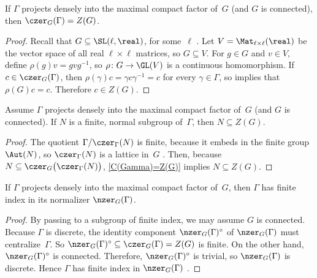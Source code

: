 \begin{cor} \label{C(Gamma)=Z(G)}
 If\/ $\Gamma$ projects densely into the maximal compact factor of~$G$ \textup(and $G$ is connected\/\textup), then $\czer_G(\Gamma) = Z(G)$.
 \end{cor}

\begin{proof}
Recall that $G \subseteq \SL(\ell,\real)$, for some~$\ell$ .
 Let $V = \Mat_{\ell \times \ell}(\real)$ be the vector
space of all real $\ell \times \ell$ matrices, so $G
\subseteq V$. For $g \in G$ and $v \in V$, define $\rho(g) v
= g v g^{-1}$, so $\rho \colon G \to \GL(V)$ is a
continuous homomorphism. If $c \in \czer_G(\Gamma)$, then
 $ \rho(\gamma) c = \gamma c \gamma^{-1} = c$
 for every $\gamma \in \Gamma$, so
 implies that $\rho(G) c = c$.
Therefore $c \in Z(G)$.
 \end{proof}

\begin{cor} \label{NinZ(G)}
 Assume\/ $\Gamma$ projects densely into the maximal compact
factor of~$G$ \textup(and $G$ is connected\/\textup).
 If $N$ is a finite, normal subgroup of\/~$\Gamma$, then $N
\subseteq Z(G)$.
 \end{cor}

\begin{proof}
 The quotient $\Gamma/ \czer_\Gamma(N)$ is finite,
because it embeds in the finite group $\Aut(N)$,
 so $\czer_\Gamma(N)$ is a lattice in~$G$
.
 Then, because $N \subseteq \czer_G \bigl( \czer_\Gamma(N) \bigr)$,
\cref{C(Gamma)=Z(G)} implies $N \subseteq Z(G)$.
 \end{proof}

\begin{cor} \label{latticenormalizer}
 If\/ $\Gamma$ projects densely into the maximal compact
factor of~$G$, then\/ $\Gamma$ has finite index in
its normalizer $\nzer_G(\Gamma)$.
 \end{cor}

\begin{proof}
By passing to a subgroup of finite index, we may assume $G$ is connected.
 Because $\Gamma$ is discrete, the identity component
$\nzer_G(\Gamma)^\circ$ of $\nzer_G(\Gamma)$ must
centralize~$\Gamma$. So $\nzer_G(\Gamma)^\circ \subseteq
\czer_G(\Gamma) = Z(G)$ is finite. On the other hand,
$\nzer_G(\Gamma)^\circ$ is connected. Therefore,
$\nzer_G(\Gamma)^\circ$ is trivial, so $\nzer_G(\Gamma)$ is
discrete. Hence $\Gamma$ has finite index in
$\nzer_G(\Gamma)$ .
 \end{proof}

